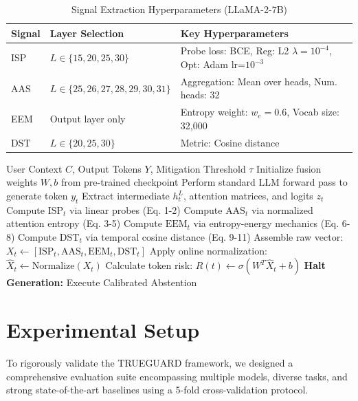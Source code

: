 \documentclass[conference]{IEEEtran}
\begin{document}
\begin{table}[!htbp]
\centering
\caption{Signal Extraction Hyperparameters (LLaMA-2-7B)}
\label{tab:hyperparams}
\begin{tabular}{p{1.2cm} p{2.8cm} p{3.6cm}}
\toprule
Signal & Layer Selection & Key Hyperparameters \\
\midrule
ISP & $L \in \{15,20,25,30\}$ & Probe loss: BCE, Reg: L2 $\lambda=10^{-4}$, Opt: Adam lr=$10^{-3}$ \\
AAS & $L \in \{25,26,27,28,29,30,31\}$ & Aggregation: Mean over heads, Num. heads: 32 \\
EEM & Output layer only & Entropy weight: $w_e = 0.6$, Vocab size: 32,000 \\
DST & $L \in \{20,25,30\}$ & Metric: Cosine distance \\
\bottomrule
\end{tabular}
\end{table}

\begin{algorithm}
\caption{TRUEGUARD Real-Time Detection Pipeline}
\begin{algorithmic}[1]
\REQUIRE User Context $C$, Output Tokens $Y$, Mitigation Threshold $\tau$
\STATE Initialize fusion weights $W, b$ from pre-trained checkpoint
    \STATE Perform standard LLM forward pass to generate token $y_t$
    \STATE Extract intermediate $h_t^L$, attention matrices, and logits $z_t$
    \STATE Compute $\text{ISP}_t$ via linear probes (Eq. 1-2)
    \STATE Compute $\text{AAS}_t$ via normalized attention entropy (Eq. 3-5)
    \STATE Compute $\text{EEM}_t$ via entropy-energy mechanics (Eq. 6-8)
    \STATE Compute $\text{DST}_t$ via temporal cosine distance (Eq. 9-11)
    \STATE Assemble raw vector: $X_t \leftarrow [\text{ISP}_t, \text{AAS}_t, \text{EEM}_t, \text{DST}_t]$
    \STATE Apply online normalization: $\hat{X}_t \leftarrow \text{Normalize}(X_t)$
    \STATE Calculate token risk: $R(t) \leftarrow \sigma(W^T \hat{X}_t + b)$
        \STATE \textbf{Halt Generation:} Execute Calibrated Abstention
    \ENDIF
\ENDFOR
\end{algorithmic}
\end{algorithm}

\section{Experimental Setup}
To rigorously validate the TRUEGUARD framework, we designed a comprehensive evaluation suite encompassing multiple models, diverse tasks, and strong state-of-the-art baselines using a 5-fold cross-validation protocol.
\end{document}
